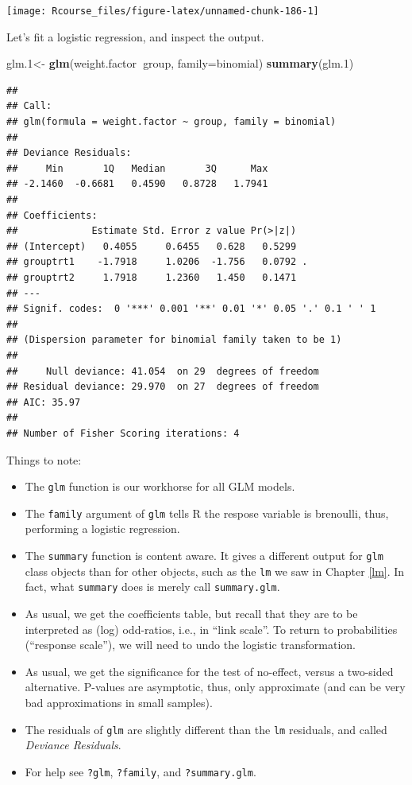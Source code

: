 \documentclass[]{book}
\newenvironment{Shaded}{\begin{snugshade}}{\end{snugshade}}
\newcommand{\KeywordTok}[1]{\textcolor[rgb]{0.13,0.29,0.53}{\textbf{#1}}}
\newcommand{\DataTypeTok}[1]{\textcolor[rgb]{0.13,0.29,0.53}{#1}}
\newcommand{\DecValTok}[1]{\textcolor[rgb]{0.00,0.00,0.81}{#1}}
\newcommand{\StringTok}[1]{\textcolor[rgb]{0.31,0.60,0.02}{#1}}
\newcommand{\OperatorTok}[1]{\textcolor[rgb]{0.81,0.36,0.00}{\textbf{#1}}}
\newcommand{\NormalTok}[1]{#1}
\providecommand{\tightlist}{%
  \setlength{\itemsep}{0pt}\setlength{\parskip}{0pt}}
\theoremstyle{definition}
\theoremstyle{definition}
\theoremstyle{definition}
\theoremstyle{remark}
\begin{document}
\texttt{[image: Rcourse\_files/figure-latex/unnamed-chunk-186-1]}

Let's fit a logistic regression, and inspect the output.

\begin{Shaded}
\begin{Highlighting}[]
\NormalTok{glm.}\DecValTok{1}\NormalTok{<-}\StringTok{ }\KeywordTok{glm}\NormalTok{(weight.factor}\OperatorTok{~}\NormalTok{group, }\DataTypeTok{family=}\NormalTok{binomial)}
\KeywordTok{summary}\NormalTok{(glm.}\DecValTok{1}\NormalTok{)}
\end{Highlighting}
\end{Shaded}

\begin{verbatim}
## 
## Call:
## glm(formula = weight.factor ~ group, family = binomial)
## 
## Deviance Residuals: 
##     Min       1Q   Median       3Q      Max  
## -2.1460  -0.6681   0.4590   0.8728   1.7941  
## 
## Coefficients:
##             Estimate Std. Error z value Pr(>|z|)  
## (Intercept)   0.4055     0.6455   0.628   0.5299  
## grouptrt1    -1.7918     1.0206  -1.756   0.0792 .
## grouptrt2     1.7918     1.2360   1.450   0.1471  
## ---
## Signif. codes:  0 '***' 0.001 '**' 0.01 '*' 0.05 '.' 0.1 ' ' 1
## 
## (Dispersion parameter for binomial family taken to be 1)
## 
##     Null deviance: 41.054  on 29  degrees of freedom
## Residual deviance: 29.970  on 27  degrees of freedom
## AIC: 35.97
## 
## Number of Fisher Scoring iterations: 4
\end{verbatim}

Things to note:

\begin{itemize}
\tightlist
\item
  The \texttt{glm} function is our workhorse for all GLM models.
\item
  The \texttt{family} argument of \texttt{glm} tells R the respose
  variable is brenoulli, thus, performing a logistic regression.
\item
  The \texttt{summary} function is content aware. It gives a different
  output for \texttt{glm} class objects than for other objects, such as
  the \texttt{lm} we saw in Chapter \ref{lm}. In fact, what
  \texttt{summary} does is merely call \texttt{summary.glm}.
\item
  As usual, we get the coefficients table, but recall that they are to
  be interpreted as (log) odd-ratios, i.e., in ``link scale''. To return
  to probabilities (``response scale''), we will need to undo the
  logistic transformation.
\item
  As usual, we get the significance for the test of no-effect, versus a
  two-sided alternative. P-values are asymptotic, thus, only approximate
  (and can be very bad approximations in small samples).
\item
  The residuals of \texttt{glm} are slightly different than the
  \texttt{lm} residuals, and called \emph{Deviance Residuals}.
\item
  For help see \texttt{?glm}, \texttt{?family}, and
  \texttt{?summary.glm}.
\end{itemize}
\end{document}
